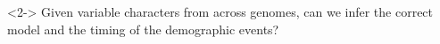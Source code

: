 \begin{frame}[t,label=fullmodel]

    \bigskip
    \begin{minipage}[t][0.45\textheight][t]{\linewidth}
            \begin{center}
                \begin{onlyenv}<2->
                Given variable characters from across genomes, can we infer the
                correct model and the timing of the demographic events?
                \end{onlyenv}
            \end{center}

    \end{minipage}
\end{frame}
